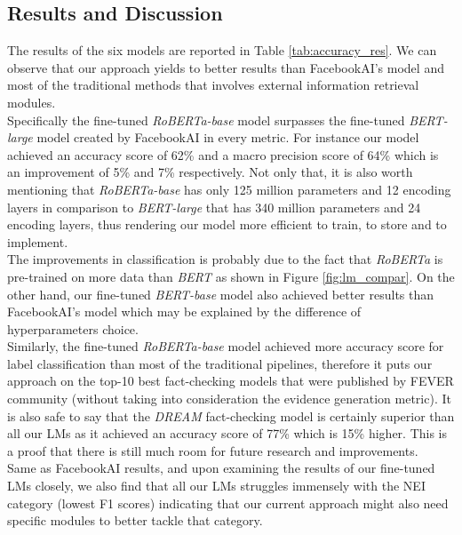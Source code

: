 \documentclass[conference]{IEEEtran}
\begin{document}
\subsection{Results and Discussion}
The results of the six models are reported in Table \ref{tab:accuracy_res}. We can observe that our approach yields to better results than FacebookAI's model and most of the traditional methods that involves external information retrieval modules.\\

Specifically the fine-tuned \textit{RoBERTa-base} model surpasses the fine-tuned \textit{BERT-large} model created by FacebookAI in every metric. For instance our model achieved an accuracy score of 62\% and a macro precision score of 64\% which is an improvement of 5\% and 7\% respectively. Not only that, it is also worth mentioning that \textit{RoBERTa-base} has only 125 million parameters and 12 encoding layers in comparison to \textit{BERT-large} that has 340 million parameters and 24 encoding layers, thus rendering our model more efficient to train, to store and to implement.\\

The improvements in classification is probably due to the fact that \textit{RoBERTa} is pre-trained on more data than \textit{BERT} as shown in Figure \ref{fig:lm_compar}. On the other hand, our fine-tuned \textit{BERT-base} model also achieved better results than FacebookAI's model which may be explained by the difference of hyperparameters choice.\\

Similarly, the fine-tuned \textit{RoBERTa-base} model achieved more accuracy score for label classification than most of the traditional pipelines, therefore it puts our approach on the top-10 best fact-checking models that were published by FEVER community\cite{thorne2018fact} (without taking into consideration the evidence generation metric). It is also safe to say that the \textit{DREAM} fact-checking model is certainly superior than all our LMs as it achieved an accuracy score of 77\% which is 15\% higher. This is a proof that there is still much room for future research and improvements.\\

Same as FacebookAI results\cite{lee2020language}, and upon examining the results of our fine-tuned LMs closely, we also find that all our LMs struggles immensely with the NEI category (lowest F1 scores) indicating that our current approach might also need specific modules to better tackle that category.\\
\end{document}
